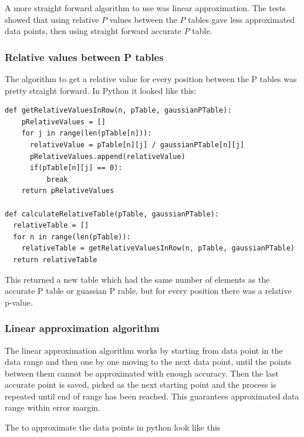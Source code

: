 \documentclass[12pt]{article}
\begin{document}
A more straight forward algorithm to use was linear approximation. The tests showed that using relative $P$ values between the $P$ tables gave less approximated data points, then using straight forward accurate $P$ table.

\subsubsection{Relative values between P tables}

The algorithm to get a relative value for every position between the P tables was pretty straight forward. In Python it looked like this:

\begin{verbatim}
def getRelativeValuesInRow(n, pTable, gaussianPTable):
    pRelativeValues = []
    for j in range(len(pTable[n])):
      relativeValue = pTable[n][j] / gaussianPTable[n][j]
      pRelativeValues.append(relativeValue)
      if(pTable[n][j] == 0):
          break
    return pRelativeValues

def calculateRelativeTable(pTable, gaussianPTable):
  relativeTable = []
  for n in range(len(pTable)):
    relativeTable = getRelativeValuesInRow(n, pTable, gaussianPTable)
  return relativeTable

\end{verbatim}

This returned a new table which had the same number of elements as the accurate P table or guassian P rable, but for every position there was a relative p-value.

\subsubsection{Linear approximation algorithm}

The linear approximation algorithm works by starting from data point in the data range and then one by one moving to the next data point, until the points between them cannot be approximated with enough accuracy. Then the last accurate point is saved, picked as the next starting point and the process is repeated until end of range has been reached. This guarantees approximated data range within error margin.

The to approximate the data points in python look like this
\end{document}
